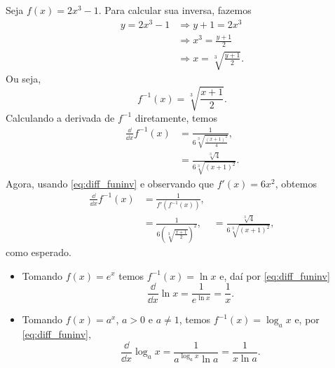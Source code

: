 \begin{ex}
  Seja $f(x) = 2x^3-1$. Para calcular sua inversa, fazemos
  \begin{align}
    y = 2x^3-1 &\Rightarrow y+1 = 2x^3\\
               &\Rightarrow x^3 = \frac{y+1}{2}\\
               &\Rightarrow x = \sqrt[3]{\frac{y+1}{2}}.
  \end{align}
  Ou seja,
  \begin{equation}
    f^{-1}(x) = \sqrt[3]{\frac{x+1}{2}}.
  \end{equation}
  Calculando a derivada de $f^{-1}$ diretamente, temos
  \begin{align}
    \frac{\dd}{\dd x}f^{-1}(x) &= \frac{1}{6\sqrt[3]{\frac{(x+1)^2}{4}}},\\
                          &= \frac{\sqrt[3]{4}}{6\sqrt[3]{(x+1)^2}}.
  \end{align}
  Agora, usando \eqref{eq:diff_funinv} e observando que $f'(x) = 6x^2$, obtemos
  \begin{align}
    \frac{\dd}{\dd x}f^{-1}(x) &= \frac{1}{f'(f^{-1}(x))},\\
                               &= \frac{1}{6\left(\sqrt[3]{\frac{x+1}{2}}\right)^2},
                               &= \frac{\sqrt[3]{4}}{6\sqrt[3]{(x+1)^2}},
  \end{align}
  como esperado.
\end{ex}

\begin{ex}
  \begin{itemize}
  \item Tomando $f(x) = e^x$ temos $f^{-1}(x) = \ln x$ e, daí por \eqref{eq:diff_funinv}
    \begin{equation}
      \frac{\dd }{\dd x}\ln x = \frac{1}{e^{\ln x}} = \frac{1}{x}.
    \end{equation}
  \item Tomando $f(x) = a^x$, $a> 0$ e $a\neq 1$, temos $f^{-1}(x) = \log_a x$ e, por \eqref{eq:diff_funinv},
    \begin{equation}
      \frac{\dd}{\dd x}\log_a x = \frac{1}{a^{\log_a x}\ln a} = \frac{1}{x\ln a}.
    \end{equation}
  \end{itemize}
\end{ex}

